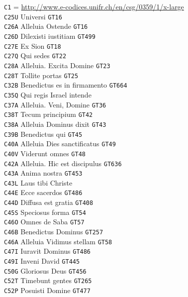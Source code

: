 \documentclass[a4paper]{article}
\begin{document}
{\begin{multicols}{2}
\noindent
\texttt{C1} = \url{http://www.e-codices.unifr.ch/en/csg/0359/1/x-large}\\
\texttt{C25U} Universi \texttt{GT16}\\
\texttt{C26A} Alleluia Ostende \texttt{GT16}\\
\texttt{C26D} Dilexisti iustitiam \texttt{GT499}\\
\texttt{C27E} Ex Sion \texttt{GT18}\\
\texttt{C27Q} Qui sedes \texttt{GT22}\\
\texttt{C28A} Alleluia. Excita Domine \texttt{GT23}\\
\texttt{C28T} Tollite portas \texttt{GT25}\\
\texttt{C32B} Benedictus es in firmamento \texttt{GT664}\\
\texttt{C35Q} Qui regis Israel intende\\
\texttt{C37A} Alleluia. Veni, Domine \texttt{GT36}\\
\texttt{C38T} Tecum principium \texttt{GT42}\\
\texttt{C38A} Alleluia Dominus dixit \texttt{GT43}\\
\texttt{C39B} Benedictus qui \texttt{GT45}\\
\texttt{C40A} Alleluia Dies sanctificatus \texttt{GT49}\\
\texttt{C40V} Viderunt omnes \texttt{GT48}\\
\texttt{C42A} Alleluia. Hic est discipulus \texttt{GT636}\\
\texttt{C43A} Anima nostra \texttt{GT453}\\
\texttt{C43L} Laus tibi Christe\\
\texttt{C44E} Ecce sacerdos \texttt{GT486}\\
\texttt{C44D} Diffusa est gratia \texttt{GT408}\\
\texttt{C45S} Speciosus forma \texttt{GT54}\\
\texttt{C46O} Omnes de Saba \texttt{GT57}\\
\texttt{C46B} Benedictus Dominus \texttt{GT257}\\
\texttt{C46A} Alleluia Vidimus stellam \texttt{GT58}\\
\texttt{C47I} Iuravit Dominus \texttt{GT486}\\
\texttt{C49I} Inveni David \texttt{GT445}\\
\texttt{C50G} Gloriosus Deus \texttt{GT456}\\
\texttt{C52T} Timebunt gentes \texttt{GT265}\\
\texttt{C52P} Posuisti Domine \texttt{GT477}\\

\end{multicols}}
\end{document}
